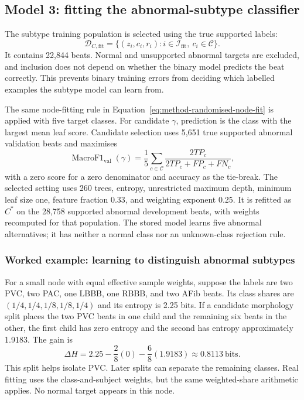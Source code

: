 \subsection{Model 3: fitting the abnormal-subtype classifier}

The subtype training population is selected using the true supported labels:
\begin{equation}
 \mathcal{D}_{C,\mathrm{fit}}=
 \{(z_i,c_i,r_i):i\in\mathcal{I}_{\mathrm{fit}},\ c_i\in\mathcal{C}\}.
 \label{eq:method-subtype-training-population}
\end{equation}
It contains 22,844 beats. Normal and unsupported abnormal targets are
excluded, and inclusion does not depend on whether the binary model predicts
the beat correctly. This prevents binary training errors from deciding which
labelled examples the subtype model can learn from.

The same node-fitting rule in
Equation~\ref{eq:method-randomised-node-fit} is applied with five target
classes. For candidate $\gamma$, prediction is the class with the largest
mean leaf score. Candidate selection uses 5,651 true supported abnormal
validation beats and maximises
\begin{equation}
 \operatorname{MacroF1}_{\mathrm{val}}(\gamma)=
 \frac{1}{5}\sum_{c\in\mathcal{C}}
 \frac{2TP_c}{2TP_c+FP_c+FN_c},
 \label{eq:method-subtype-selection-objective}
\end{equation}
with a zero score for a zero denominator and accuracy as the tie-break.
The selected setting uses 260 trees, entropy, unrestricted maximum depth,
minimum leaf size one, feature fraction 0.33, and weighting exponent 0.25.
It is refitted as $C^*$ on the 28,758 supported abnormal development beats,
with weights recomputed for that population. The stored model learns five
abnormal alternatives; it has neither a normal class nor an unknown-class
rejection rule.

\subsubsection*{Worked example: learning to distinguish abnormal subtypes}

For a small node with equal effective sample weights, suppose the labels are
two PVC, two PAC, one LBBB, one RBBB, and two AFib beats. Its class shares
are $(1/4,1/4,1/8,1/8,1/4)$ and its entropy is 2.25 bits. If a candidate
morphology split places the two PVC beats in one child and the remaining
six beats in the other, the first child has zero entropy and the second
has entropy approximately 1.9183. The gain is
\begin{equation}
 \Delta H=2.25-\frac{2}{8}(0)-\frac{6}{8}(1.9183)
          \approx0.8113\ \text{bits}.
 \label{eq:method-example-subtype-gain}
\end{equation}
This split helps isolate PVC. Later splits can separate the remaining
classes. Real fitting uses the class-and-subject weights, but the same
weighted-share arithmetic applies. No normal target appears in this node.

